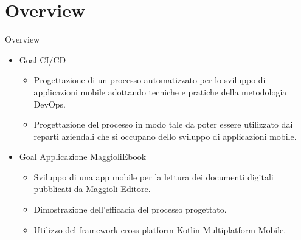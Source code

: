 
\section{Overview}
    \begin{frame}{Overview}
        \begin{itemize}
            \item Goal CI/CD
                \begin{itemize}
                    \item Progettazione di un processo automatizzato per lo sviluppo di applicazioni mobile adottando tecniche e pratiche della metodologia DevOps.
                    \item Progettazione del processo in modo tale da poter essere utilizzato dai reparti aziendali che si occupano dello sviluppo di applicazioni mobile.
                \end{itemize}
            \item Goal Applicazione MaggioliEbook
                \begin{itemize}
                    \item Sviluppo di una app mobile per la lettura dei documenti digitali pubblicati da Maggioli Editore.
                    \item Dimostrazione dell'efficacia del processo progettato.
                    \item Utilizzo del framework cross-platform Kotlin Multiplatform Mobile.
                \end{itemize}
        \end{itemize}
    \end{frame}